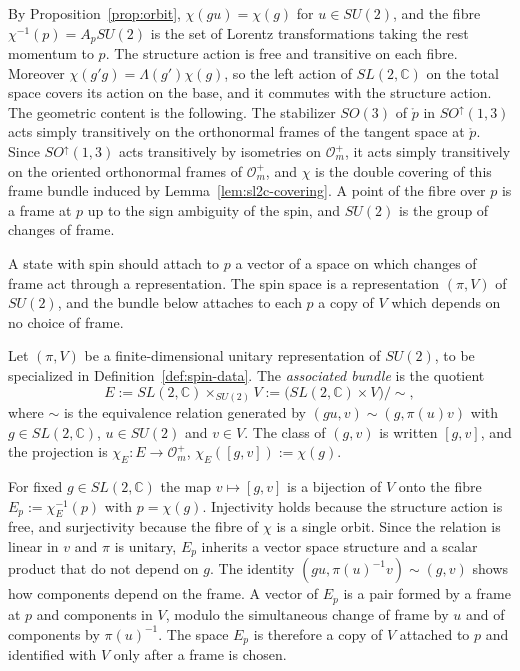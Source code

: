 \begin{remark}
	By Proposition~\ref{prop:orbit}, $\chi(gu)=\chi(g)$ for $u\in SU(2)$, and the fibre $\chi^{-1}(p)=A_pSU(2)$ is the set of Lorentz transformations taking the rest momentum to $p$. The structure action is free and transitive on each fibre. Moreover $\chi(g'g)=\Lambda(g')\chi(g)$, so the left action of $SL(2,\mathbb{C})$ on the total space covers its action on the base, and it commutes with the structure action. The geometric content is the following. The stabilizer $SO(3)$ of $\mathring{p}$ in $SO^\uparrow(1,3)$ acts simply transitively on the orthonormal frames of the tangent space at $\mathring{p}$. Since $SO^\uparrow(1,3)$ acts transitively by isometries on $\mathcal{O}_m^+$, it acts simply transitively on the oriented orthonormal frames of $\mathcal{O}_m^+$, and $\chi$ is the double covering of this frame bundle induced by Lemma~\ref{lem:sl2c-covering}. A point of the fibre over $p$ is a frame at $p$ up to the sign ambiguity of the spin, and $SU(2)$ is the group of changes of frame.
\end{remark}

A state with spin should attach to $p$ a vector of a space on which changes of frame act through a representation. The spin space is a representation $(\pi,V)$ of $SU(2)$, and the bundle below attaches to each $p$ a copy of $V$ which depends on no choice of frame.

\begin{definition}\label{def:associated-bundle}
	Let $(\pi,V)$ be a finite-dimensional unitary representation of $SU(2)$, to be specialized in Definition~\ref{def:spin-data}. The \emph{associated bundle} is the quotient
	\begin{equation*}
		E:=SL(2,\mathbb{C})\times_{SU(2)}V:=\big(SL(2,\mathbb{C})\times V\big)/\!\sim,
	\end{equation*}
	where $\sim$ is the equivalence relation generated by $(gu,v)\sim(g,\pi(u)v)$ with $g\in SL(2,\mathbb{C})$, $u\in SU(2)$ and $v\in V$. The class of $(g,v)$ is written $[g,v]$, and the projection is $\chi_E:E\to\mathcal{O}_m^+$, $\chi_E([g,v]):=\chi(g)$.
\end{definition}

\begin{remark}
	For fixed $g\in SL(2,\mathbb{C})$ the map $v\mapsto[g,v]$ is a bijection of $V$ onto the fibre $E_p:=\chi_E^{-1}(p)$ with $p=\chi(g)$. Injectivity holds because the structure action is free, and surjectivity because the fibre of $\chi$ is a single orbit. Since the relation is linear in $v$ and $\pi$ is unitary, $E_p$ inherits a vector space structure and a scalar product that do not depend on $g$. The identity $(gu,\pi(u)^{-1}v)\sim(g,v)$ shows how components depend on the frame. A vector of $E_p$ is a pair formed by a frame at $p$ and components in $V$, modulo the simultaneous change of frame by $u$ and of components by $\pi(u)^{-1}$. The space $E_p$ is therefore a copy of $V$ attached to $p$ and identified with $V$ only after a frame is chosen.
\end{remark}

